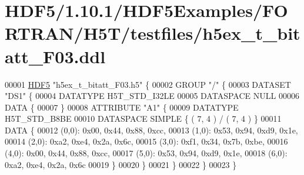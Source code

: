 \hypertarget{_h_d_f5_21_810_81_2_h_d_f5_examples_2_f_o_r_t_r_a_n_2_h5_t_2testfiles_2h5ex__t__bitatt___f03_8ddl_source}{}\section{H\+D\+F5/1.10.1/\+H\+D\+F5\+Examples/\+F\+O\+R\+T\+R\+A\+N/\+H5\+T/testfiles/h5ex\+\_\+t\+\_\+bitatt\+\_\+\+F03.ddl}
\label{_h_d_f5_21_810_81_2_h_d_f5_examples_2_f_o_r_t_r_a_n_2_h5_t_2testfiles_2h5ex__t__bitatt___f03_8ddl_source}

\begin{DoxyCode}
00001 \hyperlink{namespace_h_d_f5}{HDF5} \textcolor{stringliteral}{"h5ex\_t\_bitatt\_F03.h5"} \{
00002 GROUP \textcolor{stringliteral}{"/"} \{
00003    DATASET \textcolor{stringliteral}{"DS1"} \{
00004       DATATYPE  H5T\_STD\_I32LE
00005       DATASPACE  NULL
00006       DATA \{
00007       \}
00008       ATTRIBUTE \textcolor{stringliteral}{"A1"} \{
00009          DATATYPE  H5T\_STD\_B8BE
00010          DATASPACE  SIMPLE \{ ( 7, 4 ) / ( 7, 4 ) \}
00011          DATA \{
00012          (0,0): 0x00, 0x44, 0x88, 0xcc,
00013          (1,0): 0x53, 0x94, 0xd9, 0x1e,
00014          (2,0): 0xa2, 0xe4, 0x2a, 0x6c,
00015          (3,0): 0xf1, 0x34, 0x7b, 0xbe,
00016          (4,0): 0x00, 0x44, 0x88, 0xcc,
00017          (5,0): 0x53, 0x94, 0xd9, 0x1e,
00018          (6,0): 0xa2, 0xe4, 0x2a, 0x6c
00019          \}
00020       \}
00021    \}
00022 \}
00023 \}
\end{DoxyCode}
